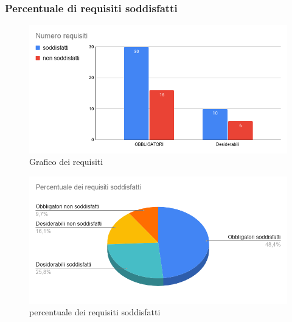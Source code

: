 \subsubsection{Percentuale di requisiti soddisfatti}

    \begin{figure}[H]
        \centering
        \includegraphics[width=15 cm]{source/sections/images/num-requisiti.png}
        \caption{Grafico dei requisiti}
    \end{figure}

    \begin{figure}[H]
        \centering
        \includegraphics[width=15 cm]{source/sections/images/percentuale-requisiti.png}
        \caption{percentuale dei requisiti soddisfatti}
    \end{figure}

